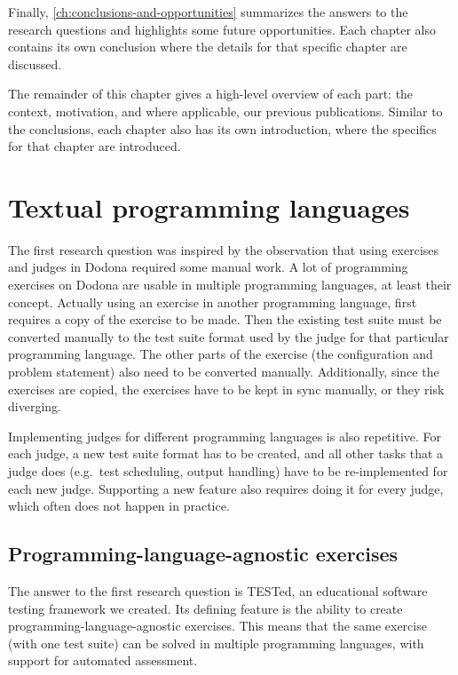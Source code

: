\documentclass[../main]{subfiles}
\begin{document}
Finally, \cref{ch:conclusions-and-opportunities} summarizes the answers to the research questions and highlights some future opportunities.
Each chapter also contains its own conclusion where the details for that specific chapter are discussed.

The remainder of this chapter gives a high-level overview of each part: the context, motivation, and where applicable, our previous publications.
Similar to the conclusions, each chapter also has its own introduction, where the specifics for that chapter are introduced.

\section{Textual programming languages}\label{sec:intro-tested}

The first research question  was inspired by the observation that using exercises and judges in Dodona required some manual work.
A lot of programming exercises on Dodona are usable in multiple programming languages, at least their concept.
Actually using an exercise in another programming language, first requires a copy of the exercise to be made.
Then the existing test suite must be converted manually to the test suite format used by the judge for that particular programming language.
The other parts of the exercise (the configuration and problem statement) also need to be converted manually.
Additionally, since the exercises are copied, the exercises have to be kept in sync manually, or they risk diverging.

Implementing judges for different programming languages is also repetitive.
For each judge, a new test suite format has to be created, and all other tasks that a judge does (e.g.\ test scheduling, output handling) have to be re-implemented for each new judge.
Supporting a new feature also requires doing it for every judge, which often does not happen in practice.

\subsection{Programming-language-agnostic exercises}\label{subsec:programming-language-agnostic-testing}

The answer to the first research question  is TESTed, an educational software testing framework we created.
Its defining feature is the ability to create programming-language-agnostic exercises.
This means that the same exercise (with one test suite) can be solved in multiple programming languages, with support for automated assessment.
\end{document}
